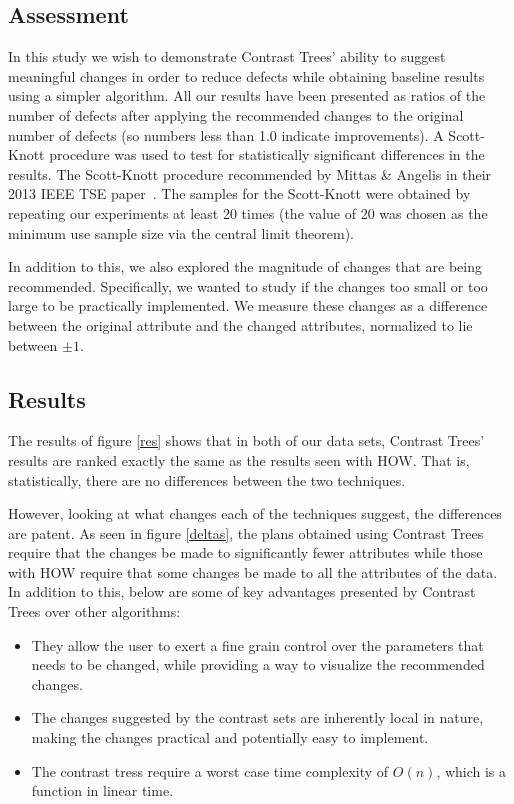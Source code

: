 \documentclass[conference]{IEEEtran}
\begin{document}
	\subsection{Assessment}
	In this study we wish to demonstrate Contrast Trees' ability to suggest meaningful changes in order to reduce defects while obtaining baseline results using a simpler algorithm. All our results have been presented as ratios of the number of defects after applying the recommended changes to the original number of defects (so numbers less than 1.0 indicate improvements). A Scott-Knott procedure was used to test for statistically significant differences in the results.
The Scott-Knott procedure recommended by Mittas \& Angelis in their 2013
IEEE TSE paper~\cite{mittas13}. The samples for the Scott-Knott were obtained by repeating our experiments at least 20 times (the value of 20 was chosen as the minimum use sample size via the central limit theorem).
	
	In addition to this, we also explored the magnitude of changes that are being recommended. Specifically, we wanted to study if the changes too small or too large to be practically implemented. We measure these changes as a difference between the original attribute and the changed attributes, normalized to lie between $\pm1$. 
	\subsection{Results}
	The results of figure \ref{res} shows that in both of our
 data sets, Contrast Trees' results are ranked exactly the same as the results seen
 with HOW. That is, statistically, there are no differences between the two techniques. 
 
 However, looking at what changes each of the techniques suggest, the differences are patent. As seen in figure \ref{deltas}, the plans obtained using Contrast Trees require that the changes be made to significantly fewer attributes while those with HOW require that some changes be made to all the attributes of the data. In addition to this, below are some of key advantages presented by Contrast Trees over other algorithms:
	
	\begin{itemize}
		\item They allow the user to exert a fine grain control over the parameters that needs to be changed, while providing a way to visualize the recommended changes.
		\item The changes suggested by the contrast sets are inherently local in nature, making the changes practical and potentially easy to implement.
		\item The contrast tress require a worst case time complexity of $O(n)$, which is a function in linear time.
	\end{itemize}
\end{document}
